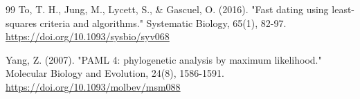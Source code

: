 \documentclass[10pt,letterpaper]{article}
\begin{document}
\begin{thebibliography}{99}
 To, T. H., Jung, M., Lycett, S., \& Gascuel, O. (2016). "Fast dating using least-squares criteria and algorithms." Systematic Biology, 65(1), 82-97. \url{https://doi.org/10.1093/sysbio/syv068}

 Yang, Z. (2007). "PAML 4: phylogenetic analysis by maximum likelihood." Molecular Biology and Evolution, 24(8), 1586-1591. \url{https://doi.org/10.1093/molbev/msm088}
\end{thebibliography}
\end{document}
